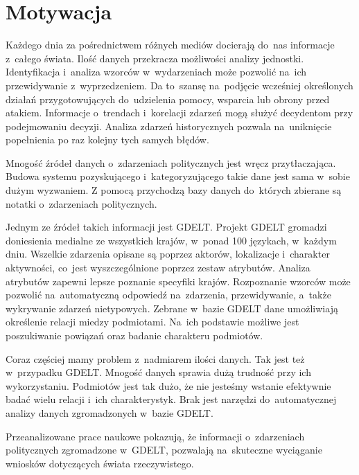 \documentclass[11pt]{report}
\begin{document}
    \section{Motywacja}\label{sec:motywacja}
    Każdego dnia za pośrednictwem różnych mediów docierają do~nas informacje z~całego świata.
    Ilość danych przekracza możliwości analizy jednostki.
    Identyfikacja i~analiza wzorców w~wydarzeniach może pozwolić na~ich przewidywanie z~wyprzedzeniem.
    Da to~szansę na~podjęcie wcześniej określonych działań przygotowujących do~udzielenia pomocy, wsparcia lub obrony przed atakiem.
    Informacje o~trendach i~korelacji zdarzeń mogą służyć decydentom przy podejmowaniu decyzji.
    Analiza zdarzeń historycznych pozwala na~uniknięcie popełnienia po raz kolejny tych samych błędów.

    Mnogość źródeł danych o~zdarzeniach politycznych jest wręcz przytłaczająca.
    Budowa systemu pozyskującego i~kategoryzującego takie dane jest sama w~sobie dużym wyzwaniem.
    Z pomocą przychodzą bazy danych do~których zbierane są notatki o~zdarzeniach politycznych.


    Jednym ze źródeł takich informacji jest GDELT\@.
    Projekt GDELT gromadzi doniesienia medialne ze wszystkich krajów, w~ponad 100 językach, w~każdym dniu.
    Wszelkie zdarzenia opisane są poprzez aktorów, lokalizacje i~charakter aktywności, co~jest wyszczególnione poprzez zestaw atrybutów.
    Analiza atrybutów zapewni lepsze poznanie specyfiki krajów.
    Rozpoznanie wzorców może pozwolić na~automatyczną odpowiedź na~zdarzenia, przewidywanie, a~także wykrywanie zdarzeń nietypowych.
    Zebrane w~bazie GDELT dane umożliwiają określenie relacji miedzy podmiotami.
    Na~ich podstawie możliwe jest poszukiwanie powiązań oraz badanie charakteru podmiotów.

    Coraz częściej mamy problem z~nadmiarem ilości danych.
    Tak jest też w~przypadku GDELT\@.
    Mnogość danych sprawia dużą trudność przy ich wykorzystaniu.
    Podmiotów jest tak dużo, że nie jesteśmy wstanie efektywnie badać wielu relacji i~ich charakterystyk.
    Brak jest narzędzi do~automatycznej analizy danych zgromadzonych w~bazie GDELT\@.

    Przeanalizowane prace naukowe pokazują, że informacji o~zdarzeniach politycznych zgromadzone w~GDELT,
    pozwalają na~skuteczne wyciąganie wniosków dotyczących świata rzeczywistego.
\end{document}
